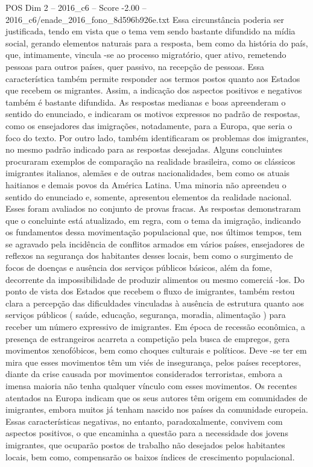 \begin{textsample}{POS Dim 2 – 2016\_c6 – Score -2.00 – 2016\_c6/enade\_2016\_fono\_8d596b926e.txt}
Essa circunstância poderia ser justificada, tendo em vista que o tema vem sendo bastante difundido na mídia social, gerando elementos naturais para a resposta, bem como da história do país, que, intimamente, vincula -se ao processo migratório, quer ativo, remetendo pessoas para outros países, quer passivo, na recepção de pessoas.
Essa característica também permite responder aos termos postos quanto aos Estados que recebem os migrantes.
Assim, a indicação dos aspectos positivos e negativos também é bastante difundida.
As respostas medianas e boas apreenderam o sentido do enunciado, e indicaram os motivos expressos no padrão de respostas, como os ensejadores das imigrações, notadamente, para a Europa, que seria o foco do texto.
Por outro lado, também identificaram os problemas dos imigrantes, no mesmo padrão indicado para as respostas desejadas.
Alguns concluintes procuraram exemplos de comparação na realidade brasileira, como os clássicos imigrantes italianos, alemães e de outras nacionalidades, bem como os atuais haitianos e demais povos da América Latina.
Uma minoria não apreendeu o sentido do enunciado e, somente, apresentou elementos da realidade nacional.
Esses foram avaliados no conjunto de provas fracas.
As respostas demonstraram que o concluinte está atualizado, em regra, com o tema da imigração, indicando os fundamentos dessa movimentação populacional que, nos últimos tempos, tem se agravado pela incidência de conflitos armados em vários países, ensejadores de reflexos na segurança dos habitantes desses locais, bem como o surgimento de focos de doenças e ausência dos serviços públicos básicos, além da fome, decorrente da impossibilidade de produzir alimentos ou mesmo comerciá -los.
Do ponto de vista dos Estados que recebem o fluxo de imigrantes, também restou clara a percepção das dificuldades vinculadas à ausência de estrutura quanto aos serviços públicos ( saúde, educação, segurança, moradia, alimentação ) para receber um número expressivo de imigrantes.
Em época de recessão econômica, a presença de estrangeiros acarreta a competição pela busca de empregos, gera movimentos xenofóbicos, bem como choques culturais e políticos.
Deve -se ter em mira que esses movimentos têm um viés de insegurança, pelos países receptores, diante da crise causada por movimentos considerados terroristas, embora a imensa maioria não tenha qualquer vínculo com esses movimentos.
Os recentes atentados na Europa indicam que os seus autores têm origem em comunidades de imigrantes, embora muitos já tenham nascido nos países da comunidade europeia.
Essas características negativas, no entanto, paradoxalmente, convivem com aspectos positivos, o que encaminha a questão para a necessidade dos jovens imigrantes, que ocuparão postos de trabalho não desejados pelos habitantes locais, bem como, compensarão os baixos índices de crescimento populacional.

\end{textsample}
